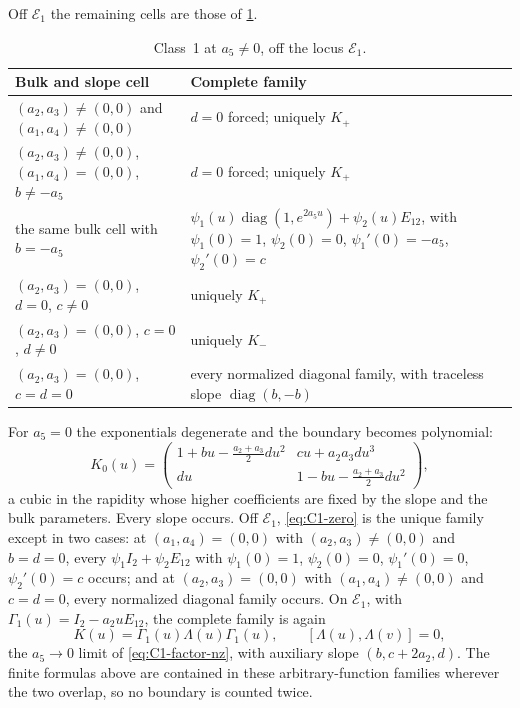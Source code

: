 \documentclass[11pt,reqno]{amsart}
\theoremstyle{plain}
\theoremstyle{definition}
\theoremstyle{remark}
\numberwithin{equation}{section}
\providecommand{\diag}{\operatorname{diag}}
\newcommand{\Id}{I_2}
\begin{document}
Off $\mathcal E_1$ the remaining cells are those of \cref{tab:C1-nonzero}.

\begin{table}[t]
\centering\small
\caption{Class~1 at $a_5\ne0$, off the locus $\mathcal E_1$.}
\label{tab:C1-nonzero}
\begin{tabularx}{\textwidth}{>{\RaggedRight\arraybackslash}X >{\RaggedRight\arraybackslash}X}
\toprule
Bulk and slope cell & Complete family \\
\midrule
$(a_2,a_3)\ne(0,0)$ and $(a_1,a_4)\ne(0,0)$ & $d=0$ forced; uniquely $K_+$ \\
$(a_2,a_3)\ne(0,0)$, $(a_1,a_4)=(0,0)$, $b\ne-a_5$ & $d=0$ forced; uniquely $K_+$ \\
the same bulk cell with $b=-a_5$ &
$\psi_1(u)\diag(1,e^{2a_5u})+\psi_2(u)E_{12}$, with
$\psi_1(0)=1$, $\psi_2(0)=0$, $\psi_1'(0)=-a_5$, $\psi_2'(0)=c$ \\
$(a_2,a_3)=(0,0)$, $d=0$, $c\ne0$ & uniquely $K_+$ \\
$(a_2,a_3)=(0,0)$, $c=0$, $d\ne0$ & uniquely $K_-$ \\
$(a_2,a_3)=(0,0)$, $c=d=0$ & every normalized diagonal family, with traceless slope $\diag(b,-b)$ \\
\bottomrule
\end{tabularx}
\end{table}

For $a_5=0$ the exponentials degenerate and the boundary becomes polynomial:
\begin{equation}
K_0(u)=\begin{pmatrix}
1+bu-\frac{a_2+a_3}{2}du^2&cu+a_2a_3du^3\\
du&1-bu-\frac{a_2+a_3}{2}du^2
\end{pmatrix},                                      \label{eq:C1-zero}
\end{equation}
a cubic in the rapidity whose higher coefficients are fixed by the slope and the
bulk parameters. Every slope occurs. Off $\mathcal E_1$, \cref{eq:C1-zero} is the
unique family except in two cases: at $(a_1,a_4)=(0,0)$ with $(a_2,a_3)\ne(0,0)$
and $b=d=0$, every $\psi_1\Id+\psi_2E_{12}$ with $\psi_1(0)=1$, $\psi_2(0)=0$,
$\psi_1'(0)=0$, $\psi_2'(0)=c$ occurs; and at $(a_2,a_3)=(0,0)$ with
$(a_1,a_4)\ne(0,0)$ and $c=d=0$, every normalized diagonal family occurs. On
$\mathcal E_1$, with $\Gamma_1(u)=\Id-a_2uE_{12}$, the complete family is again
\begin{equation}
K(u)=\Gamma_1(u)\Lambda(u)\Gamma_1(u),\qquad [\Lambda(u),\Lambda(v)]=0,
\label{eq:C1-factor-zero}
\end{equation}
the $a_5\to0$ limit of \cref{eq:C1-factor-nz}, with auxiliary slope
$(b,c+2a_2,d)$. The finite formulas above are contained in these
arbitrary-function families wherever the two overlap, so no boundary is counted
twice.
\end{document}

